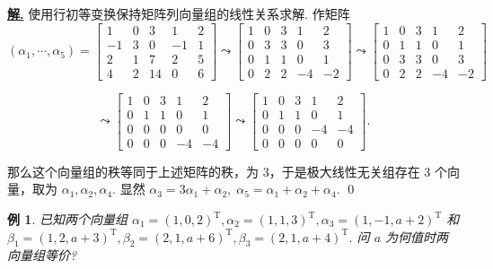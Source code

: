 \documentclass[10pt,openany]{article}
\theoremstyle{thmstyle} %
\theoremstyle{defstyle} %
\theoremstyle{prostyle} %
\theoremstyle{exastyle}
\newtheorem{example}[theorem]{例}
\theoremstyle{remstyle}
\newenvironment{solution}{\par\underline{\textbf{解.}} \;\fangsong}{\qed\par}
\newcommand{\T}{^{\text{T}}}
\begin{document}
\begin{solution}
	使用行初等变换保持矩阵列向量组的线性关系求解. 作矩阵
	\[ (\alpha_1,\cdots,\alpha_5)= \begin{bmatrix}
		1 & 0 & 3 & 1 & 2 \\
		-1 & 3 & 0 & -1 & 1 \\
		2 & 1 & 7 & 2 & 5 \\
		4 & 2 & 14 & 0 & 6 
	\end{bmatrix} \leadsto \begin{bmatrix}
	1 & 0 & 3 & 1 & 2 \\
	0 & 3 & 3 & 0 & 3 \\
	0 & 1 & 1 & 0 & 1 \\
	0 & 2 & 2 & -4 & -2 
	\end{bmatrix} \leadsto \begin{bmatrix}
	1 & 0 & 3 & 1 & 2 \\
	0 & 1 & 1 & 0 & 1 \\
	0 & 3 & 3 & 0 & 3 \\
	0 & 2 & 2 & -4 & -2 
	\end{bmatrix} \]
	
	\[ \leadsto \begin{bmatrix}
		1 & 0 & 3 & 1 & 2 \\
		0 & 1 & 1 & 0 & 1 \\
		0 & 0 & 0 & 0 & 0 \\
		0 & 0 & 0 & -4 & -4 
	\end{bmatrix} \leadsto \begin{bmatrix}
	1 & 0 & 3 & 1 & 2 \\
	0 & 1 & 1 & 0 & 1 \\
	0 & 0 & 0 & -4 & -4 \\
	0 & 0 & 0 & 0 & 0 
	\end{bmatrix}. \]
	
	那么这个向量组的秩等同于上述矩阵的秩，为 3，于是极大线性无关组存在 3 个向量，取为 \( \alpha_1,\alpha_2,\alpha_4 \). 显然 \( \alpha_3=3\alpha_1+\alpha_2, \; \alpha_5=\alpha_1+\alpha_2+\alpha_4 \).
\end{solution}


\begin{example}
	已知两个向量组 \( \alpha_1=(1,0,2)\T, \alpha_2=(1,1,3)\T, \alpha_3=(1,-1,a+2)\T \) 和 \( \beta_1=(1,2,a+3)\T, \beta_2=(2,1,a+6)\T, \beta_3=(2,1,a+4)\T \). 问 \( a \) 为何值时两向量组等价?
\end{example}
\end{document}
